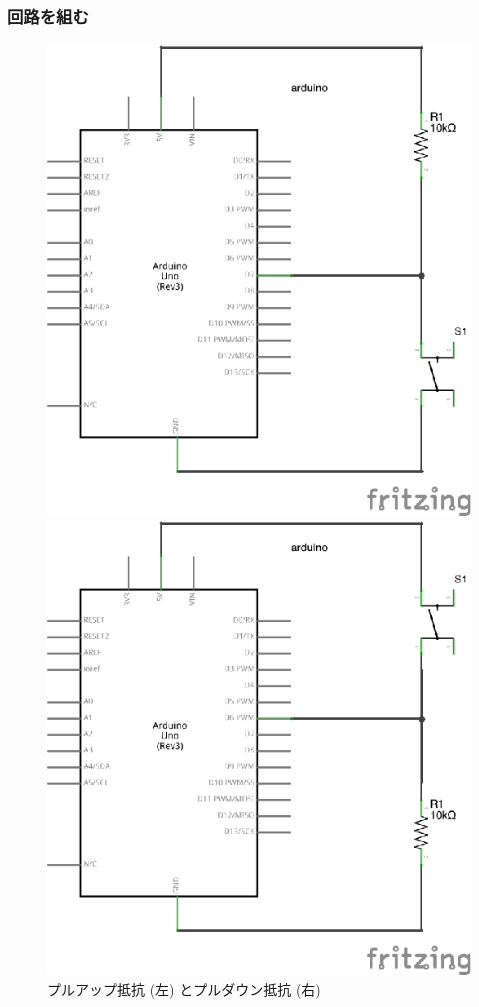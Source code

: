 \documentclass[11pt,a4paper]{jarticle}
\begin{document}
\subsubsection{回路を組む}
\begin{figure}[htbp]
 \begin{minipage}{0.5\columnwidth}
  \centering
  \includegraphics[width=0.7\columnwidth]{img/pullup.eps}
 \end{minipage}
 \begin{minipage}{0.5\columnwidth}
  \centering
  \includegraphics[width=0.7\columnwidth]{img/pulldown.eps}
 \end{minipage}
  \caption{プルアップ抵抗 (左) とプルダウン抵抗 (右)}
\end{figure}
\end{document}
